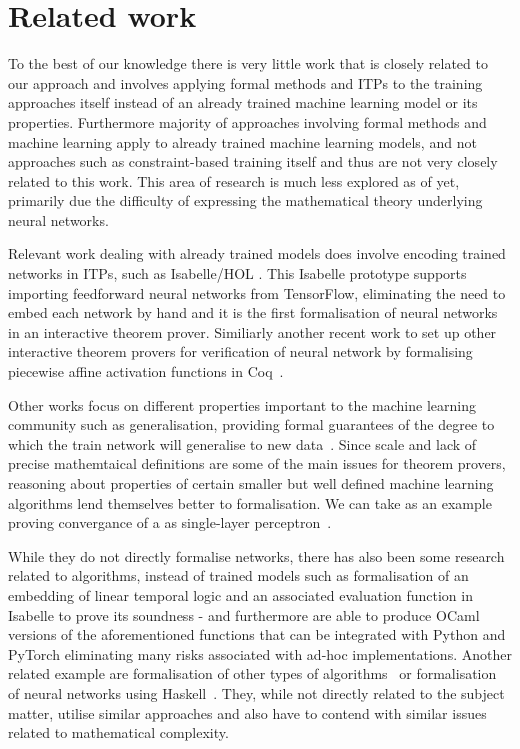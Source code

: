 \documentclass[a4paper,UKenglish,cleveref, autoref, thm-restate]{lipics-v2021}
\begin{document}
\section{Related work}

To the best of our knowledge there is very little work that is closely related to our approach and involves applying formal methods and ITPs to the training approaches itself instead of an already trained machine learning model or its properties. Furthermore majority of approaches involving formal methods and machine learning  apply to already trained machine learning models, and not approaches such as constraint-based training itself and thus are not very closely related to this work. This area of research is much less explored as of yet, primarily due the difficulty of expressing the mathematical theory underlying neural networks. 

Relevant work dealing with already trained models does involve encoding trained networks in ITPs, such as Isabelle/HOL \cite{brucker2023verifying}. This Isabelle prototype supports importing feedforward neural networks from TensorFlow, eliminating the need to embed each network by hand and it is the first formalisation of neural networks in an interactive theorem prover. Similiarly another recent work to set up other interactive theorem provers for verification of neural network by formalising piecewise affine activation functions in Coq~\cite{aleksandrov2023formalizing}. 

Other works focus on different properties important to the machine learning community such as generalisation, providing formal guarantees of the degree to which the train network will generalise to new data~\cite{bagnall2019certifying}. Since scale and lack of precise mathemtaical definitions are some of the main issues for theorem provers, reasoning about properties of certain smaller but well defined machine learning algorithms lend themselves better to formalisation. We can take as an example proving convergance of a as single-layer perceptron~\cite{murphy2017verified}.

While they do not directly formalise networks, there has also been some research related to algorithms, instead of trained models such as formalisation of an embedding of linear temporal logic and an associated evaluation function in Isabelle to prove its soundness - and furthermore are able to produce OCaml versions of the aforementioned functions that can be integrated with Python and PyTorch eliminating many risks associated with ad-hoc implementations\cite{chevallier2022constrained}. Another related example are formalisation of other types of algorithms~\cite{daukantas2021trimming} or formalisation of neural networks using Haskell~\cite{xie2023haskell}. They, while not directly related to the subject matter, utilise similar approaches and also have to contend with similar issues related to mathematical complexity.
\end{document}
